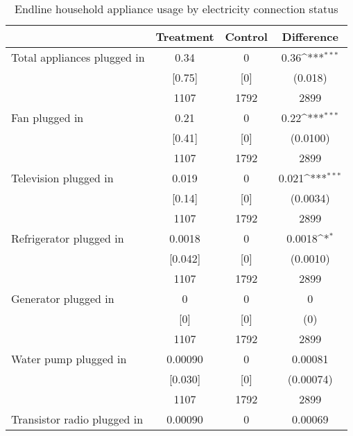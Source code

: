 \begin{table}[htbp]\centering
\def\sym#1{\ifmmode^{#1}\else\(^{#1}\)\fi}
\caption{Endline household appliance usage by electricity connection status \label{tab:"balance"}}
\begin{tabular*}{0.9\hsize}{@{\hskip\tabcolsep\extracolsep\fill}l*{1}{ccc}}
\toprule
                                &Treatment&  Control&Difference         \\
\midrule
Total appliances plugged in     &     0.34&        0&     0.36\sym{***}\\
                                &   [0.75]&      [0]&  (0.018)         \\
                                &     1107&     1792&     2899         \\
Fan plugged in                  &     0.21&        0&     0.22\sym{***}\\
                                &   [0.41]&      [0]& (0.0100)         \\
                                &     1107&     1792&     2899         \\
Television plugged in           &    0.019&        0&    0.021\sym{***}\\
                                &   [0.14]&      [0]& (0.0034)         \\
                                &     1107&     1792&     2899         \\
Refrigerator plugged in         &   0.0018&        0&   0.0018\sym{*}  \\
                                &  [0.042]&      [0]& (0.0010)         \\
                                &     1107&     1792&     2899         \\
Generator plugged in            &        0&        0&        0         \\
                                &      [0]&      [0]&      (0)         \\
                                &     1107&     1792&     2899         \\
Water pump plugged in           &  0.00090&        0&  0.00081         \\
                                &  [0.030]&      [0]&(0.00074)         \\
                                &     1107&     1792&     2899         \\
Transistor radio plugged in     &  0.00090&        0&  0.00069         \\

\end{tabular*}
\end{table}
